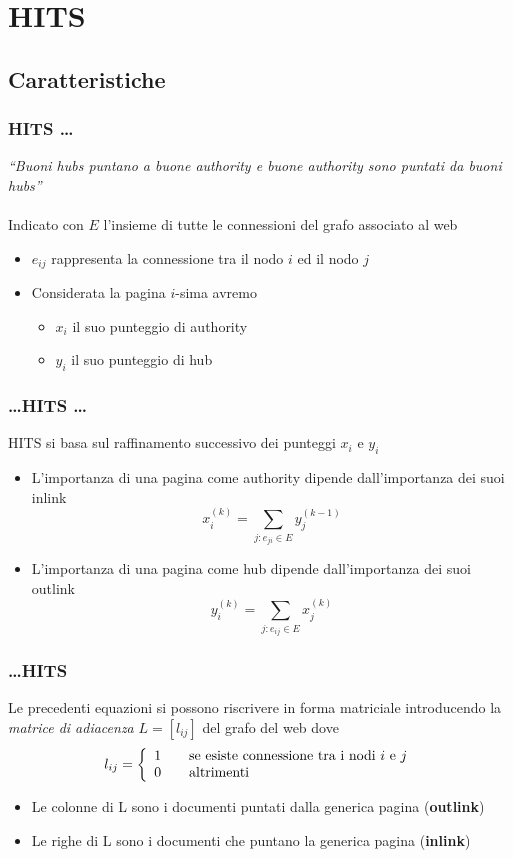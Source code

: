 \documentclass{beamer}
\begin{document}
\section{HITS}
\subsection{Caratteristiche}
\begin{frame}
	\frametitle{HITS \dots}
	\emph{``Buoni hubs puntano a buone authority e buone authority sono puntati da buoni hubs''}\\~\\
	Indicato con $E$ l'insieme di tutte le connessioni del grafo associato al web
	\begin{itemize}
		\item $e_{ij}$ rappresenta la connessione tra il nodo $i$ ed il nodo $j$
		\item Considerata la pagina $i$-sima avremo
		\begin{itemize}
			\item $x_i$ il suo punteggio di authority
			\item $y_i$ il suo punteggio di hub
		\end{itemize}
	\end{itemize}
\end{frame}
\begin{frame}
	\frametitle{\dots HITS \dots}
	HITS si basa sul raffinamento successivo dei punteggi $x_i$ e $y_i$
	\begin{itemize}
		\item L'importanza di una pagina come authority dipende dall'importanza dei suoi inlink $$x_i^{(k)}=\sum_{j:e_{ji}\in E}y_j^{(k-1)}$$
		\item L'importanza di una pagina come hub dipende dall'importanza dei suoi outlink $$y_i^{(k)}=\sum_{j:e_{ij}\in E}x_j^{(k)}$$
	\end{itemize}
\end{frame}
\begin{frame}
	\frametitle{\dots HITS}
	Le precedenti equazioni si possono riscrivere in forma matriciale introducendo la \emph{matrice di adiacenza} $L=[l_{ij}]$ del grafo del web dove
	\[ l_{ij} = \left\{ 
	\begin{array}{l l}
	1 & \quad \text{se esiste connessione tra i nodi $i$ e $j$}\\
	0 & \quad \text{altrimenti}
	\end{array} \right.\]
	\begin{itemize}
		\item Le colonne di L sono i documenti puntati dalla generica pagina (\textbf{outlink})
		\item Le righe di L sono i documenti che puntano la generica pagina (\textbf{inlink})
	\end{itemize}
\end{frame}
\end{document}
